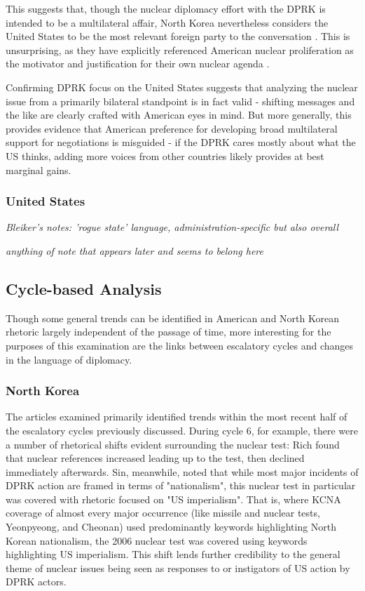 \documentclass{article}
\begin{document}
This suggests that, though the nuclear diplomacy effort with the DPRK is intended to be a multilateral affair, North Korea nevertheless considers the United States to be the most relevant foreign party to the conversation \cite{rich14}. This is unsurprising, as they have explicitly referenced American nuclear proliferation as the motivator and justification for their own nuclear agenda \cite{kcna, kcna3, kcna4}.

Confirming DPRK focus on the United States suggests that analyzing the nuclear issue from a primarily bilateral standpoint is in fact valid - shifting messages and the like are clearly crafted with American eyes in mind. But more generally, this provides evidence that American preference for developing broad multilateral support for negotiations is misguided - if the DPRK cares mostly about what the US thinks, adding more voices from other countries likely provides at best marginal gains.

\subsubsection{United States}
\emph{Bleiker's notes: 'rogue state' language, administration-specific but also overall}

\emph{anything of note that appears later and seems to belong here}


\subsection{Cycle-based Analysis}
Though some general trends can be identified in American and North Korean rhetoric largely independent of the passage of time, more interesting for the purposes of this examination are the links between escalatory cycles and changes in the language of diplomacy. 

\subsubsection{North Korea}

The articles examined primarily identified trends within the most recent half of the escalatory cycles previously discussed. During cycle 6, for example, there were a number of rhetorical shifts evident surrounding the nuclear test: Rich found that nuclear references increased leading up to the test, then declined immediately afterwards\cite{rich14}. Sin, meanwhile, noted that while most major incidents of DPRK action are framed in terms of "nationalism", this nuclear test in particular was covered with rhetoric focused on "US imperialism"\cite{sin}. That is, where KCNA coverage of almost every major occurrence (like missile and nuclear tests, Yeonpyeong, and Cheonan) used predominantly keywords highlighting North Korean nationalism, the 2006 nuclear test was covered using keywords highlighting US imperialism. This shift lends further credibility to the general theme of nuclear issues being seen as responses to or instigators of US action by DPRK actors.
\end{document}
